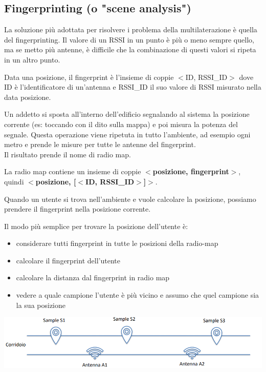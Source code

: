 \subsection{Fingerprinting (o "scene analysis")}
La soluzione più adottata per risolvere i problema della multilaterazione è quella del fingerprinting.
Il valore di un RSSI in un punto è più o meno sempre quello, ma se metto più antenne, è difficile che la combinazione di questi valori si ripeta in un altro punto.

Data una posizione, il fingerprint è l’insieme di coppie $<$ID, RSSI\_ID$>$ dove ID è l’identificatore di un’antenna e RSSI\_ID il suo valore di RSSI misurato nella data posizione.

Un addetto si sposta all'interno dell'edificio segnalando al sistema la posizione corrente (es: toccando con il dito sulla mappa) e poi misura la potenza del segnale.
Questa operazione viene ripetuta in tutto l'ambiente, ad esempio ogni metro e prende le misure per tutte le antenne del fingerprint. 
\\ Il risultato prende il nome di radio map. 

La radio map contiene un insieme di coppie \textbf{$<$posizione, fingerprint$>$}, quindi \textbf{$<$posizione, [$<$ID, RSSI\_ID$>$]$>$}.

Quando un utente si trova nell'ambiente e vuole calcolare la posizione, possiamo prendere il fingerprint nella posizione corrente. 

Il modo più semplice per trovare la posizione dell'utente è: 
\begin{itemize}
    \item considerare tutti fingerprint in tutte le posizioni della radio-map
    \item calcolare il fingerprint dell'utente
    \item calcolare la distanza dal fingerprint in radio map
    \item vedere a quale campione l'utente è più vicino e assumo che quel campione sia la sua posizione
\end{itemize}


\includegraphics[width = \textwidth]{images/MobiDEV/1. posizionamento indoor/fingerprinting 1.PNG}

